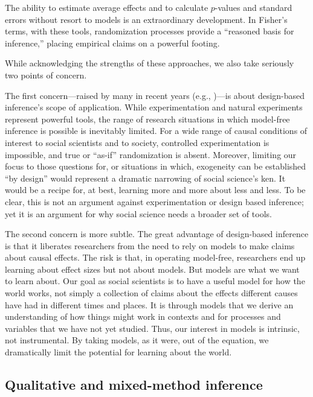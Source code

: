 \documentclass[
  12pt,
]{book}
\begin{document}
The ability to estimate average effects and to calculate \(p\)-values and standard errors without resort to models is an extraordinary development. In Fisher's terms, with these tools, randomization processes provide a ``reasoned basis for inference,'' placing empirical claims on a powerful footing.

While acknowledging the strengths of these approaches, we also take seriously two points of concern.

The first concern---raised by many in recent years (e.g., \citet{thelen2015comparative})---is about design-based inference's scope of application. While experimentation and natural experiments represent powerful tools, the range of research situations in which model-free inference is possible is inevitably limited. For a wide range of causal conditions of interest to social scientists and to society, controlled experimentation is impossible, and true or ``as-if'' randomization is absent. Moreover, limiting our focus to those questions for, or situations in which, exogeneity can be established ``by design'' would represent a dramatic narrowing of social science's ken. It would be a recipe for, at best, learning more and more about less and less. To be clear, this is not an argument against experimentation or design based inference; yet it is an argument for why social science needs a broader set of tools.

The second concern is more subtle. The great advantage of design-based inference is that it liberates researchers from the need to rely on models to make claims about causal effects. The risk is that, in operating model-free, researchers end up learning about effect sizes but not about models. But models are what we want to learn about. Our goal as social scientists is to have a useful model for how the world works, not simply a collection of claims about the effects different causes have had in different times and places. It is through models that we derive an understanding of how things might work in contexts and for processes and variables that we have not yet studied. Thus, our interest in models is intrinsic, not instrumental. By taking models, as it were, out of the equation, we dramatically limit the potential for learning about the world.

\hypertarget{qualitative-and-mixed-method-inference}{%
\subsection{Qualitative and mixed-method inference}\label{qualitative-and-mixed-method-inference}}
\end{document}
